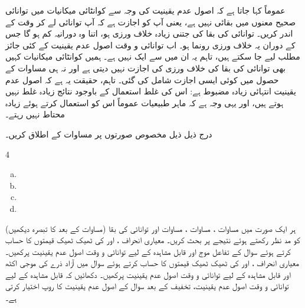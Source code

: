 عموماً کہا جاتا ہے کہ اصول عدم یقینیت کی وجہ سے  کوانٹائی میکانیات میں توانائی صحیح معنوں میں بقائی نہیں ہے، یعنی آپ کو اجازت ہے کہ آپ توانائی   لے کر وقت  کے اندر  کریں۔ توانائی کی بقا کی جتنی زیادہ خلاف ورزی ہو، اتنا وہ دورانیہ کم ہو گا جس کے دوران یہ خلاف ورزی رونما ہو۔ اب توانائی و وقت اصول عدم یقینیت کے کئی جائز مطلب لیے جا سکتے ہیں، تاہم یہ ان میں سے ایک نہیں ہے۔ ہمیں کوانٹائی میکانیات کہیں بھی توانائی کی بقا کی خلاف ورزی کی اجازت نہیں دیتی ہے اور نہ ہی
 مساوات  کے حصول میں کوئی ایسی اجازت شامل کی گئی۔ تاہم، حقیقت یہ ہے کہ اصول عدم یقینیت انتہائی زیادہ مضبوط ہے: اس کی غلط استعمال کے باوجود نتائج زیادہ غلط نہیں ہوتے ہیں، اور یہی وجہ ہے کہ ماہر طبیعیات عموماً اس کو استعمال کرتے ہوئے زیادہ محتاط نہیں رہتے۔
 
درج ذیل ذیل مخصوص صورتوں پر مساوات  کے اطلاق کریں۔
\begin{multicols}{4}
\begin{enumerate}[a.]
\item {}
\item {}
\item {}
\item {}
\end{enumerate}
\end{multicols}
 ہر ایک صورت میں مساوات ، مساوات ، مساوات  اور توانائی کی بقا (مساوات  کے بعد کا تبصرہ دیکھیں) کو مد نظر رکھتے ہوئے نتیجے پر بحث کریں۔
معیاری انحراف ،  اور  کی ٹھیک ٹھیک قیمتوں کا حساب کرتے ہوئے سوال  کے تفاعل موج اور قابل مشاہدہ  کے لیے توانائی و وقت اصول عدم یقینیت پرکھیں۔
معیاری انحراف ،  اور  کی ٹھیک ٹھیک قیمتوں کا حساب کرتے ہوئے سوال  میں آزاد ذرے کی موجی اکٹھ اور قابل مشاہدہ  کے لیے توانائی و وقت اصول عدم یقینیت پرکھیں۔
دکھائیں کہ قابل مشاہدہ  کے لیے توانائی و وقت اصول عدم یقینیت، تخفیف کے بعد سوال  کے اصول عدم یقینیت کا روپ اختیار کرتی ہے۔

